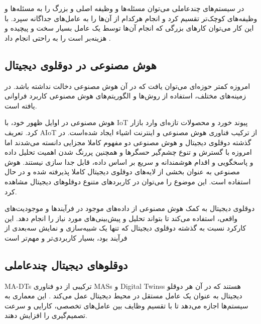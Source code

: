 \documentclass[a4paper,fleqn]{report}
\begin{document}

در سیستم‌های چندعاملی می‌توان مسئله‌ها و وظیفه اصلی و بزرگ را به مسئله‌ها و وظیفه‌های کوچک‌تر تقسیم کرد و انجام هرکدام از آن‌ها را به عامل‌های جداگانه سپرد. با این کار می‌توان کارهای بزرگی که انجام آن‌ها توسط یک عامل بسیار سخت و پیچیده  و هزینه‌بر است را به راحتی انجام داد \cite{dorri2018multiagent}.



\subsection{هوش مصنوعی در دوقلوی دیجیتال}

امروزه کمتر حوزه‌ای می‌توان یافت که در آن هوش مصنوعی دخالت نداشته‌ باشد. در زمینه‌های مختلف، استفاده از روش‌ها و الگوریتم‌های هوش مصنوعی کاربرد فراوانی یافته است. 

هوش مصنوعی در اوایل ظهور خود، با
\gls{IoT}
پیوند خورد و محصولات تازه‌ای وارد بازار کرد. تعریف 
\gls{AIoT}
از ترکیب فناوری هوش مصنوعی و اینترنت اشیاء ایجاد شده‌است. در گذشته دوقلوی دیجیتال و هوش مصنوعی دو مفهوم کاملا مجزایی دانسته می‌شدند اما امروزه با گسترش و تنوع چشم‌گیر حسگر‌ها و همچنین پررنگ شدن اهمیت تحلیل داده‌ و پاسخگویی و اقدام هوشمندانه و سریع بر اساس داده، قابل جدا سازی نیستند. هوش مصنوعی به عنوان بخشی از لایه‌های دوقلوی دیجیتال کاملا پذیرفته شده و در حال استفاده است. این موضوع را می‌توان در کاربرد‌های متنوع دوقلو‌های دیجیتال مشاهده کرد.

دوقلوی دیجیتال به کمک هوش مصنوعی از داده‌های موجود در فرآیندها و موجودیت‌های واقعی، استفاده می‌کند تا بتواند تحلیل و پیش‌بینی‌های مورد نیاز را انجام دهد. این کارکرد نسبت به گذشته دوقلوی دیجیتال که تنها یک شبیه‌سازی و نمایش سه‌بعدی از فرآیند بود، بسیار کاربردی‌تر و مهم‌تر است \cite{rozbahani2023design}


\subsection{دوقلوهای دیجیتال چندعاملی}


\glspl{MA-DT}
ترکیبی از دو فناوری \glspl{MAS} و \glspl{Digital Twins} هستند که در آن هر دوقلو دیجیتال به عنوان یک عامل مستقل در محیط دیجیتال عمل می‌کند \cite{pretel2022masdt,wang2024multiagent}. این معماری به سیستم‌ها اجازه می‌دهد تا با تقسیم وظایف بین عامل‌های تخصصی، کارایی و سرعت تصمیم‌گیری را افزایش دهند. 
\end{document}
